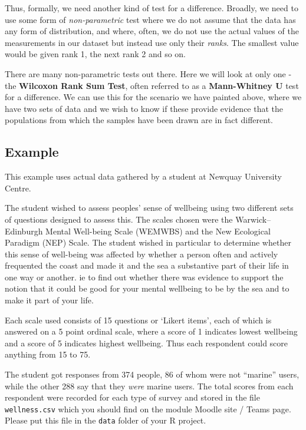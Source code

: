 \documentclass[
  letterpaper,
  DIV=11,
  numbers=noendperiod]{scrreprt}
\begin{document}
Thus, formally, we need another kind of test for a difference. Broadly,
we need to use some form of \emph{non-parametric} test where we do not
assume that the data has any form of distribution, and where, often, we
do not use the actual values of the measurements in our dataset but
instead use only their \emph{ranks}. The smallest value would be given
rank 1, the next rank 2 and so on.

There are many non-parametric tests out there. Here we will look at only
one - the \textbf{Wilcoxon Rank Sum Test}, often referred to as a
\textbf{Mann-Whitney U} test for a difference. We can use this for the
scenario we have painted above, where we have two sets of data and we
wish to know if these provide evidence that the populations from which
the samples have been drawn are in fact different.

\subsection{Example}\label{example}

This example uses actual data gathered by a student at Newquay
University Centre.

The student wished to assess peoples' sense of wellbeing using two
different sets of questions designed to assess this. The scales chosen
were the Warwick--Edinburgh Mental Well-being Scale (WEMWBS) and the New
Ecological Paradigm (NEP) Scale. The student wished in particular to
determine whether this sense of well-being was affected by whether a
person often and actively frequented the coast and made it and the sea a
substantive part of their life in one way or another. ie to find out
whether there was evidence to support the notion that it could be good
for your mental wellbeing to be by the sea and to make it part of your
life.

Each scale used consists of 15 questions or `Likert items', each of
which is answered on a 5 point ordinal scale, where a score of 1
indicates lowest wellbeing and a score of 5 indicates highest wellbeing.
Thus each respondent could score anything from 15 to 75.

The student got responses from 374 people, 86 of whom were not
``marine'' users, while the other 288 say that they \emph{were} marine
users. The total scores from each respondent were recorded for each type
of survey and stored in the file \texttt{wellness.csv} which you should
find on the module Moodle site / Teams page. Please put this file in the
\texttt{data} folder of your R project.
\end{document}
